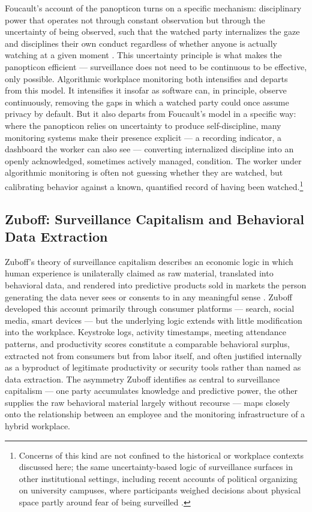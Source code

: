 \documentclass[10pt]{article}
\begin{document}
Foucault's account of the panopticon turns on a specific mechanism: disciplinary power that operates not through constant observation but through the uncertainty of being observed, such that the watched party internalizes the gaze and disciplines their own conduct regardless of whether anyone is actually watching at a given moment \cite{foucault}. This uncertainty principle is what makes the panopticon efficient --- surveillance does not need to be continuous to be effective, only possible. Algorithmic workplace monitoring both intensifies and departs from this model. It intensifies it insofar as software can, in principle, observe continuously, removing the gaps in which a watched party could once assume privacy by default. But it also departs from Foucault's model in a specific way: where the panopticon relies on uncertainty to produce self-discipline, many monitoring systems make their presence explicit --- a recording indicator, a dashboard the worker can also see --- converting internalized discipline into an openly acknowledged, sometimes actively managed, condition. The worker under algorithmic monitoring is often not guessing whether they are watched, but calibrating behavior against a known, quantified record of having been watched.\footnote{Concerns of this kind are not confined to the historical or workplace contexts discussed here; the same uncertainty-based logic of surveillance surfaces in other institutional settings, including recent accounts of political organizing on university campuses, where participants weighed decisions about physical space partly around fear of being surveilled \cite{iyer}.}

\subsection{Zuboff: Surveillance Capitalism and Behavioral Data Extraction}

Zuboff's theory of surveillance capitalism describes an economic logic in which human experience is unilaterally claimed as raw material, translated into behavioral data, and rendered into predictive products sold in markets the person generating the data never sees or consents to in any meaningful sense \cite{zuboff}. Zuboff developed this account primarily through consumer platforms --- search, social media, smart devices --- but the underlying logic extends with little modification into the workplace. Keystroke logs, activity timestamps, meeting attendance patterns, and productivity scores constitute a comparable behavioral surplus, extracted not from consumers but from labor itself, and often justified internally as a byproduct of legitimate productivity or security tools rather than named as data extraction. The asymmetry Zuboff identifies as central to surveillance capitalism --- one party accumulates knowledge and predictive power, the other supplies the raw behavioral material largely without recourse --- maps closely onto the relationship between an employee and the monitoring infrastructure of a hybrid workplace.
\end{document}
